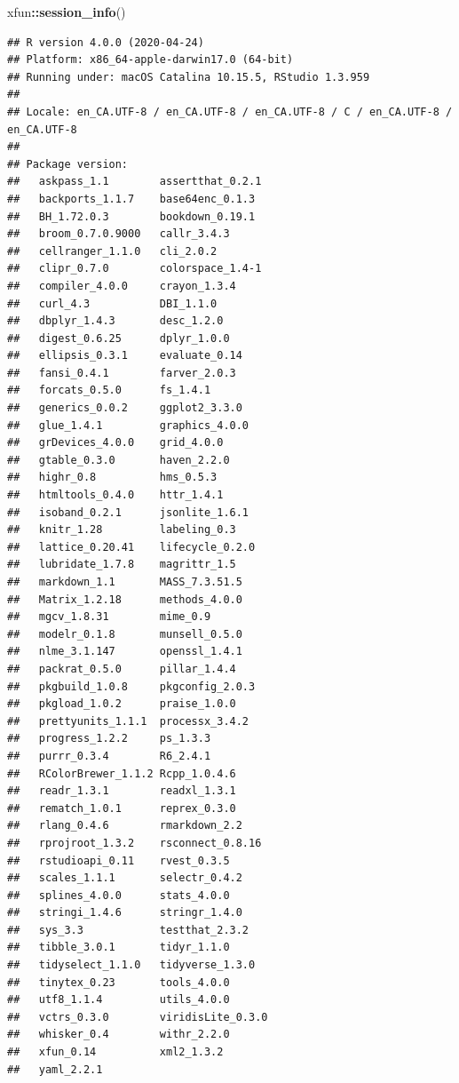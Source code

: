\documentclass[
]{krantz}
\makeatletter
\newenvironment{Shaded}{\begin{snugshade}}{\end{snugshade}}
\newcommand{\KeywordTok}[1]{\textcolor[rgb]{0.27,0.27,0.27}{\textbf{#1}}}
\newcommand{\NormalTok}[1]{#1}
\newcommand{\OperatorTok}[1]{\textcolor[rgb]{0.43,0.43,0.43}{\textbf{#1}}}
\newenvironment{kframe}{%
\medskip{}
\setlength{\fboxsep}{.8em}
 \def\at@end@of@kframe{}%
 \ifinner\ifhmode%
  \def\at@end@of@kframe{\end{minipage}}%
  \begin{minipage}{\columnwidth}%
 \fi\fi%
 \def\FrameCommand##1{\hskip\@totalleftmargin \hskip-\fboxsep
 \colorbox{shadecolor}{##1}\hskip-\fboxsep
     \hskip-\linewidth \hskip-\@totalleftmargin \hskip\columnwidth}%
 \MakeFramed {\advance\hsize-\width
   \@totalleftmargin\z@ \linewidth\hsize
   \@setminipage}}%
 {\par\unskip\endMakeFramed%
 \at@end@of@kframe}
\renewenvironment{Shaded}{\begin{kframe}}{\end{kframe}}
\makeatother
\begin{document}
\begin{Shaded}
\begin{Highlighting}[]
\NormalTok{xfun}\OperatorTok{::}\KeywordTok{session_info}\NormalTok{()}
\end{Highlighting}
\end{Shaded}

\begin{verbatim}
## R version 4.0.0 (2020-04-24)
## Platform: x86_64-apple-darwin17.0 (64-bit)
## Running under: macOS Catalina 10.15.5, RStudio 1.3.959
## 
## Locale: en_CA.UTF-8 / en_CA.UTF-8 / en_CA.UTF-8 / C / en_CA.UTF-8 / en_CA.UTF-8
## 
## Package version:
##   askpass_1.1        assertthat_0.2.1  
##   backports_1.1.7    base64enc_0.1.3   
##   BH_1.72.0.3        bookdown_0.19.1   
##   broom_0.7.0.9000   callr_3.4.3       
##   cellranger_1.1.0   cli_2.0.2         
##   clipr_0.7.0        colorspace_1.4-1  
##   compiler_4.0.0     crayon_1.3.4      
##   curl_4.3           DBI_1.1.0         
##   dbplyr_1.4.3       desc_1.2.0        
##   digest_0.6.25      dplyr_1.0.0       
##   ellipsis_0.3.1     evaluate_0.14     
##   fansi_0.4.1        farver_2.0.3      
##   forcats_0.5.0      fs_1.4.1          
##   generics_0.0.2     ggplot2_3.3.0     
##   glue_1.4.1         graphics_4.0.0    
##   grDevices_4.0.0    grid_4.0.0        
##   gtable_0.3.0       haven_2.2.0       
##   highr_0.8          hms_0.5.3         
##   htmltools_0.4.0    httr_1.4.1        
##   isoband_0.2.1      jsonlite_1.6.1    
##   knitr_1.28         labeling_0.3      
##   lattice_0.20.41    lifecycle_0.2.0   
##   lubridate_1.7.8    magrittr_1.5      
##   markdown_1.1       MASS_7.3.51.5     
##   Matrix_1.2.18      methods_4.0.0     
##   mgcv_1.8.31        mime_0.9          
##   modelr_0.1.8       munsell_0.5.0     
##   nlme_3.1.147       openssl_1.4.1     
##   packrat_0.5.0      pillar_1.4.4      
##   pkgbuild_1.0.8     pkgconfig_2.0.3   
##   pkgload_1.0.2      praise_1.0.0      
##   prettyunits_1.1.1  processx_3.4.2    
##   progress_1.2.2     ps_1.3.3          
##   purrr_0.3.4        R6_2.4.1          
##   RColorBrewer_1.1.2 Rcpp_1.0.4.6      
##   readr_1.3.1        readxl_1.3.1      
##   rematch_1.0.1      reprex_0.3.0      
##   rlang_0.4.6        rmarkdown_2.2     
##   rprojroot_1.3.2    rsconnect_0.8.16  
##   rstudioapi_0.11    rvest_0.3.5       
##   scales_1.1.1       selectr_0.4.2     
##   splines_4.0.0      stats_4.0.0       
##   stringi_1.4.6      stringr_1.4.0     
##   sys_3.3            testthat_2.3.2    
##   tibble_3.0.1       tidyr_1.1.0       
##   tidyselect_1.1.0   tidyverse_1.3.0   
##   tinytex_0.23       tools_4.0.0       
##   utf8_1.1.4         utils_4.0.0       
##   vctrs_0.3.0        viridisLite_0.3.0 
##   whisker_0.4        withr_2.2.0       
##   xfun_0.14          xml2_1.3.2        
##   yaml_2.2.1
\end{verbatim}
\end{document}
